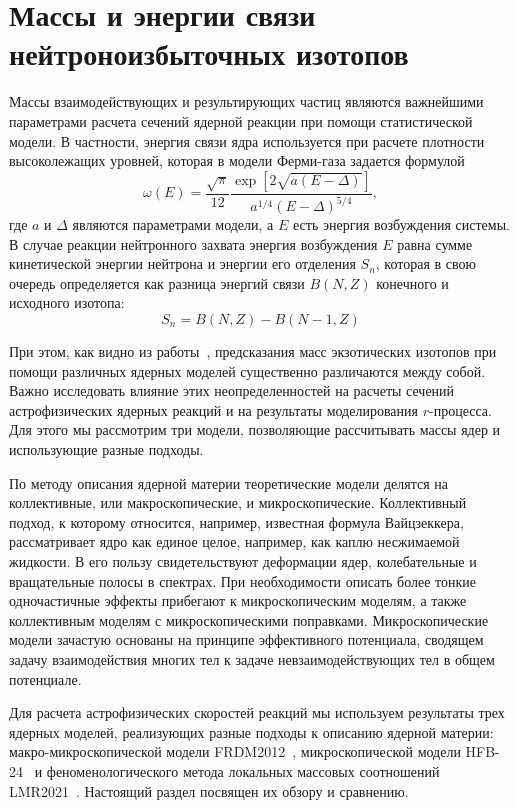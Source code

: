 \section{Массы и энергии связи нейтроноизбыточных изотопов} \label{massmodel}
Массы взаимодействующих и результирующих частиц являются важнейшими параметрами расчета сечений ядерной реакции при помощи статистической модели. В частности, энергия связи ядра используется при расчете плотности высоколежащих уровней, которая в модели Ферми-газа задается формулой
\begin{equation} \displaystyle
  \omega(E) = \frac{\sqrt{\pi}}{12} 
  \frac{\exp [ 2\sqrt{a(E-\Delta)} ] }
       {a^{1/4}(E-\Delta)^{5/4}},
\end{equation}
где $a$ и $\Delta$ являются параметрами модели, а $E$ есть энергия возбуждения системы. В случае реакции нейтронного захвата энергия возбуждения $E$ равна сумме кинетической энергии нейтрона и энергии его отделения $S_n$, которая в свою очередь определяется как разница энергий связи $B(N,Z)$ конечного и исходного изотопа:
\begin{equation}
S_n = B(N, Z) - B(N - 1, Z)
\end{equation}

При этом, как видно из работы~\cite{sobiczewski2018}, предсказания масс экзотических изотопов при помощи различных ядерных моделей существенно различаются между собой. Важно исследовать влияние этих неопределенностей на расчеты сечений астрофизических ядерных реакций и на результаты моделирования $r$-процесса. Для этого мы рассмотрим три модели, позволяющие рассчитывать массы ядер и использующие разные подходы.

По методу описания ядерной материи теоретические модели делятся на коллективные, или макроскопические, и микроскопические. Коллективный подход, к которому относится, например, известная формула Вайцзеккера, рассматривает ядро как единое целое, например, как каплю несжимаемой жидкости. В его пользу свидетельствуют деформации ядер, колебательные и вращательные полосы в спектрах. При необходимости описать более тонкие одночастичные эффекты прибегают к микроскопическим моделям, а также коллективным моделям с микроскопическими поправками. Микроскопические модели зачастую основаны на принципе эффективного потенциала, сводящем задачу взаимодействия многих тел к задаче невзаимодействующих тел в общем потенциале.

Для расчета астрофизических скоростей реакций мы используем результаты трех ядерных моделей, реализующих разные подходы к описанию ядерной материи: макро-микроскопической модели FRDM2012~\cite{moller2016}, микроскопической модели HFB-24~\cite{goriely2013} и феноменологического метода локальных массовых соотношений LMR2021~\cite{vladimirova2022}. Настоящий раздел посвящен их обзору и сравнению.

